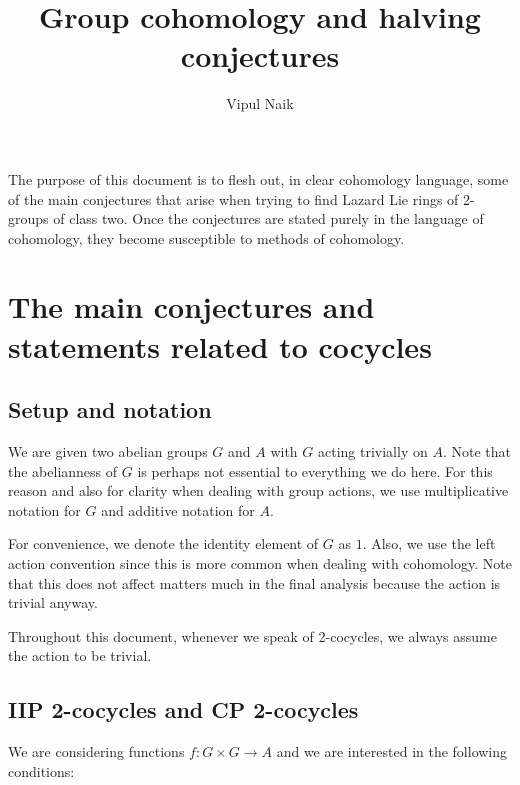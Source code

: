 \documentclass[10pt]{amsart}
\title{Group cohomology and halving conjectures}
\author{Vipul Naik}
\begin{document}
\maketitle

The purpose of this document is to flesh out, in clear cohomology
language, some of the main conjectures that arise when trying to find
Lazard Lie rings of 2-groups of class two. Once the conjectures are
stated purely in the language of cohomology, they become susceptible
to methods of cohomology.

\section{The main conjectures and statements related to cocycles}

\subsection{Setup and notation}

We are given two abelian groups $G$ and $A$ with $G$ acting trivially
on $A$. Note that the abelianness of $G$ is perhaps not essential to
everything we do here. For this reason and also for clarity when
dealing with group actions, we use multiplicative notation for $G$ and
additive notation for $A$.

For convenience, we denote the identity element of $G$ as $1$. Also,
we use the left action convention since this is more common when
dealing with cohomology. Note that this does not affect matters much
in the final analysis because the action is trivial anyway.

Throughout this document, whenever we speak of 2-cocycles, we always
assume the action to be trivial.

\subsection{IIP 2-cocycles and CP 2-cocycles}

We are considering functions $f: G \times G \to A$ and we are
interested in the following conditions:
\end{document}
